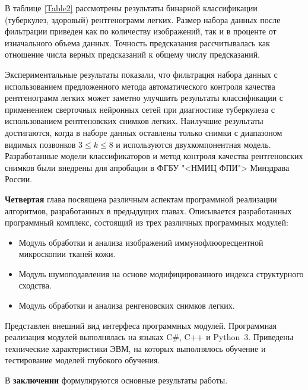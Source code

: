 В таблице \ref{Table2} рассмотрены результаты бинарной классификации (туберкулез, здоровый) рентгенограмм легких. Размер набора данных после фильтрации приведен как по количеству изображений, так и в проценте от изначального объема данных. Точность предсказания рассчитывалась как отношение числа верных предсказаний к общему числу предсказаний.

Экспериментальные результаты показали, что фильтрация набора данных с использованием предложенного метода автоматического контроля качества рентгенограмм легких может заметно улучшить результаты классификации с применением сверточных нейронных сетей при диагностике туберкулеза с использованием рентгеновских снимков легких. Наилучшие результаты достигаются, когда в наборе данных оставлены только снимки с диапазоном видимых позвонков $3 \leq k \leq 8$ и используются двухкомпонентная модель. Разработанные модели классификаторов и метод контроля качества рентгеновских снимков были внедрены для апробации в ФГБУ "<НМИЦ ФПИ"> Минздрава России. 
 
{\textbf{Четвертая}} глава посвящена различным аспектам программной реализации алгоритмов, разработанных в предыдущих главах. Описывается разработанных программный комплекс, состоящий из трех различных программных модулей: 
\begin{itemize}
	\item Модуль обработки и анализа изображений иммунофлюоресцентной микроскопии тканей кожи.
	
	\item Модуль шумоподавления на основе модифицированного индекса структурного сходства.
	
	\item Модуль обработки и анализа ренгеновских снимков легких.
\end{itemize}

Представлен внешний вид интерфеса программных модулей. Программная реализация модулей выполнялась на языках C\#,  C++ и Python~3. Приведены технические характеристики ЭВМ, на которых выполнялось обучение и тестирование моделей глубокого обучения. 

\FloatBarrier
{}                                  %
В \textbf{заключении} формулируются основные результаты работы.
%


